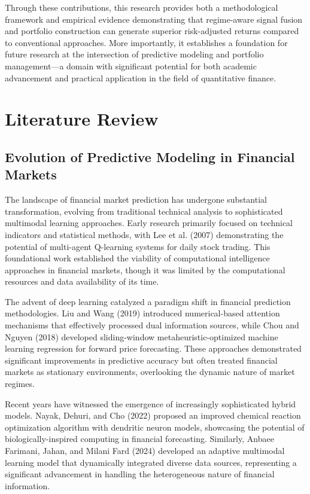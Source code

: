 \documentclass{singlecol-new}
\theoremstyle{TH}{
\newtheorem{lemma}{Lemma}
\newtheorem{theorem}[lemma]{Theorem}
\newtheorem{corrolary}[lemma]{Corrolary}
\newtheorem{conjecture}[lemma]{Conjecture}
\newtheorem{proposition}[lemma]{Proposition}
\newtheorem{claim}[lemma]{Claim}
\newtheorem{stheorem}[lemma]{Wrong Theorem}
\newtheorem{algorithm}{Algorithm}
}
\theoremstyle{THrm}{
\newtheorem{definition}{Definition}[section]
\newtheorem{question}{Question}[section]
\newtheorem{remark}{Remark}
\newtheorem{scheme}{Scheme}
}
\theoremstyle{THhit}{
\newtheorem{case}{Case}[section]
}
\begin{document}
Through these contributions, this research provides both a methodological framework and empirical evidence demonstrating that regime-aware signal fusion and portfolio construction can generate superior risk-adjusted returns compared to conventional approaches. More importantly, it establishes a foundation for future research at the intersection of predictive modeling and portfolio management—a domain with significant potential for both academic advancement and practical application in the field of quantitative finance.



\section{Literature Review} 
\subsection{Evolution of Predictive Modeling in Financial Markets}

The landscape of financial market prediction has undergone substantial transformation, evolving from traditional technical analysis to sophisticated multimodal learning approaches. Early research primarily focused on technical indicators and statistical methods, with Lee et al. (2007) demonstrating the potential of multi-agent Q-learning systems for daily stock trading. This foundational work established the viability of computational intelligence approaches in financial markets, though it was limited by the computational resources and data availability of its time.

The advent of deep learning catalyzed a paradigm shift in financial prediction methodologies. Liu and Wang (2019) introduced numerical-based attention mechanisms that effectively processed dual information sources, while Chou and Nguyen (2018) developed sliding-window metaheuristic-optimized machine learning regression for forward price forecasting. These approaches demonstrated significant improvements in predictive accuracy but often treated financial markets as stationary environments, overlooking the dynamic nature of market regimes.

Recent years have witnessed the emergence of increasingly sophisticated hybrid models. Nayak, Dehuri, and Cho (2022) proposed an improved chemical reaction optimization algorithm with dendritic neuron models, showcasing the potential of biologically-inspired computing in financial forecasting. Similarly, Anbaee Farimani, Jahan, and Milani Fard (2024) developed an adaptive multimodal learning model that dynamically integrated diverse data sources, representing a significant advancement in handling the heterogeneous nature of financial information.
\end{document}
